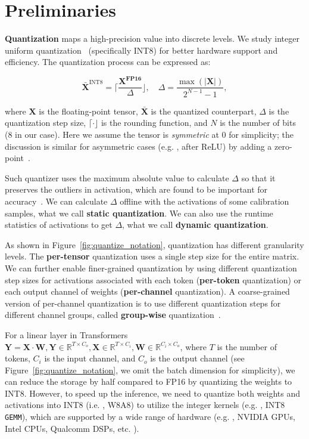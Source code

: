 \section{Preliminaries}
\label{sec:quantization}
\textbf{Quantization} maps a high-precision value into discrete levels. We study integer uniform quantization~\cite{jacob2018quantization} (specifically INT8) for better hardware support and efficiency. The quantization process can be expressed as:

\begin{equation}
    \label{eqn:quantizer}
    \bar{\mathbf{X}}^{\text{INT8}} =  \lceil\frac{\mathbf{X^{\text{FP16}}}}{\Delta}\rfloor, \quad \Delta=\frac{\max(|\mathbf{X}|)}{2^{N-1}-1},
\end{equation}

where $\mathbf{X}$ is the floating-point tensor, $\bar{\mathbf{X}}$ is the quantized counterpart, $\Delta$ is the quantization step size, $\lceil\cdot\rfloor$ is the rounding function, and $N$ is the number of bits (8 in our case). Here we assume the tensor is \emph{symmetric} at 0 for simplicity; the discussion is similar for asymmetric cases (e.g. , after ReLU) by adding a zero-point~\cite{jacob2018quantization}.

Such quantizer uses the maximum absolute value to calculate $\Delta$ so that it preserves the outliers in activation, which are found to be important for accuracy~\cite{dettmers2022llmint8}. We can calculate $\Delta$ offline with the activations of some calibration samples, what we call \textbf{static quantization}. We can also use the runtime statistics of activations to get $\Delta$, what we call \textbf{dynamic quantization}.

As shown in Figure~\ref{fig:quantize_notation}, quantization has different granularity levels. The \textbf{per-tensor} quantization uses a single step size for the entire matrix. We can further enable finer-grained quantization by using different quantization step sizes for activations associated with each token (\textbf{per-token} quantization) or each output channel of weights (\textbf{per-channel} quantization). A coarse-grained version of per-channel quantization is to use different quantization steps for different channel groups, called \textbf{group-wise} quantization~\cite{shen2020q,zeroquant}.

For a linear layer in Transformers~\cite{vaswani2017attention}
$\mathbf{Y}=\mathbf{X}\cdot \mathbf{W}, \mathbf{Y}\in\mathbb{R}^{T\times C_o}, \mathbf{X}\in\mathbb{R}^{T\times C_i}, \mathbf{W}\in\mathbb{R}^{C_i\times C_o}$, where  $T$ is the number of tokens, $C_i$ is the input channel, and $C_o$ is the output channel (see Figure~\ref{fig:quantize_notation}, we omit the batch dimension for simplicity), we can reduce the storage by half compared to FP16 by quantizing the weights to INT8. However, to speed up the inference, we need to quantize both weights and activations into INT8 (i.e. , W8A8) to utilize the integer kernels (e.g. , INT8 \texttt{GEMM}), which are supported by a wide range of hardware (e.g. , NVIDIA GPUs, Intel CPUs, Qualcomm DSPs, etc. ).

